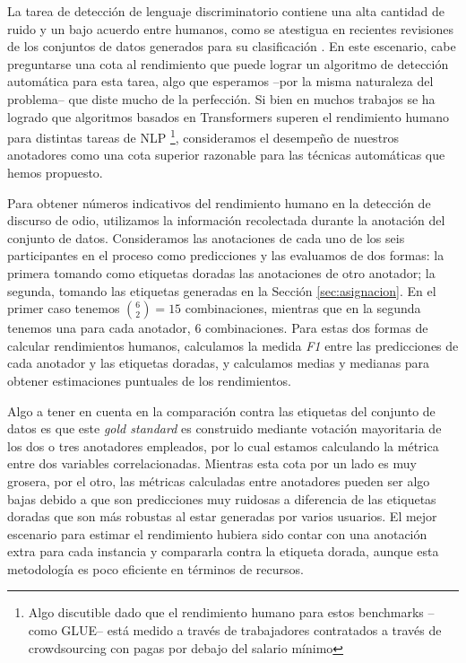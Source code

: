 La tarea de detección de lenguaje discriminatorio contiene una alta cantidad de ruido y un bajo acuerdo entre humanos, como se atestigua en recientes revisiones de los conjuntos de datos generados para su clasificación \cite{poletto2021resources}. En este escenario, cabe preguntarse una cota al rendimiento que puede lograr un algoritmo de detección automática para esta tarea, algo que esperamos --por la misma naturaleza del problema-- que diste mucho de la perfección. Si bien en muchos trabajos se ha logrado que algoritmos basados en Transformers superen el rendimiento humano para distintas tareas de NLP \footnote{Algo discutible dado que el rendimiento humano para estos benchmarks --como GLUE-- está medido a través de trabajadores contratados a través de crowdsourcing con pagas por debajo del salario mínimo}, consideramos el desempeño de nuestros anotadores como una cota superior razonable para las técnicas automáticas que hemos propuesto.

Para obtener números indicativos del rendimiento humano en la detección de discurso de odio, utilizamos la información recolectada durante la anotación del conjunto de datos. Consideramos las anotaciones de cada uno de los seis participantes en el proceso como predicciones y las evaluamos de dos formas: la primera tomando como etiquetas doradas las anotaciones de otro anotador; la segunda, tomando las etiquetas generadas en la Sección \ref{sec:asignacion}. En el primer caso tenemos $\binom{6}{2}=15$ combinaciones, mientras que en la segunda tenemos una para cada anotador, 6 combinaciones. Para estas dos formas de calcular rendimientos humanos, calculamos la medida \emph{F1} entre las predicciones de cada anotador y las etiquetas doradas, y calculamos medias y medianas para obtener estimaciones puntuales de los rendimientos.

Algo a tener en cuenta en la comparación contra las etiquetas del conjunto de datos es que este \emph{gold standard} es construido mediante votación mayoritaria de los dos o tres anotadores empleados, por lo cual estamos calculando la métrica entre dos variables correlacionadas. Mientras esta cota por un lado es muy grosera, por el otro, las métricas calculadas entre anotadores pueden ser algo bajas debido a que son predicciones muy ruidosas a diferencia de las etiquetas doradas que son más robustas al estar generadas por varios usuarios. El mejor escenario para estimar el rendimiento hubiera sido contar con una anotación extra para cada instancia y compararla contra la etiqueta dorada, aunque esta metodología es poco eficiente en términos de recursos.

